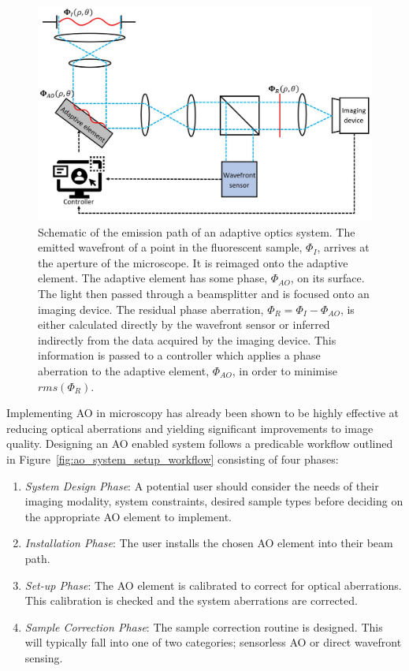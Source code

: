 \begin{figure}[h]
	\centering
	\includegraphics[width=\textwidth]{images/ao_system_schematic_simple.jpg}
	\caption[Schematic of the emission path of an adaptive optics system.]{Schematic of the emission path of an adaptive optics system. The emitted wavefront of a point in the fluorescent sample, $\Phi_{I}$, arrives at the aperture of the microscope. It is reimaged onto the adaptive element. The adaptive element has some phase, $\Phi_{AO}$, on its surface. The light then passed through a beamsplitter and is focused onto an imaging device. The residual phase aberration, $\Phi_{R} = \Phi_{I} - \Phi_{AO}$, is either calculated directly by the wavefront sensor or inferred indirectly from the data acquired by the imaging device. This information is passed to a controller which applies a phase aberration to the adaptive element, $\Phi_{AO}$, in order to minimise $rms(\Phi_{R})$.}
	\label{fig:ao_system_schematic_simple}
\end{figure}

Implementing AO in microscopy has already been shown to be highly 
effective at reducing optical aberrations and yielding significant 
improvements to image 
quality\cite{booth2014adaptive,girkin2009adaptive,fraisier2015adaptive,jesacher2011sensorless,
	jian2014wavefront}. Designing an AO enabled system follows a predicable 
workflow outlined in Figure~\ref{fig:ao_system_setup_workflow} 
consisting of four phases:

\begin{enumerate}
	\item \textit{System Design Phase}: A potential user should consider 
	the needs of their imaging modality, system constraints, desired 
	sample types before deciding on the appropriate AO element to 
	implement.
	\item \textit{Installation Phase}: The user installs the chosen AO 
	element into their beam path.
	\item \textit{Set-up Phase}: The AO element is calibrated to correct 
	for optical aberrations. This calibration is checked and the system 
	aberrations are corrected.
	\item \textit{Sample Correction Phase}: The sample correction routine 
	is designed. This will typically fall into one of two categories; 
	sensorless AO or direct wavefront sensing.
\end{enumerate}  

